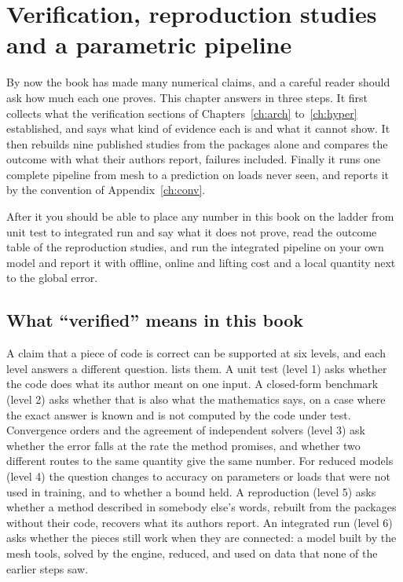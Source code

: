 \chapter{Verification, reproduction studies and a parametric pipeline}\label{ch:verif}

\begin{tcolorbox}[colback=gray!5,colframe=gray!50,title={In this chapter}]
By now the book has made many numerical claims, and a careful reader should ask how much each one proves. This chapter answers in three steps. It first collects what the verification sections of Chapters~\ref{ch:arch} to~\ref{ch:hyper} established, and says what kind of evidence each is and what it cannot show. It then rebuilds nine published studies from the packages alone and compares the outcome with what their authors report, failures included. Finally it runs one complete pipeline from mesh to a prediction on loads never seen, and reports it by the convention of Appendix~\ref{ch:conv}.\par\smallskip
After it you should be able to place any number in this book on the ladder from unit test to integrated run and say what it does not prove, read the outcome table of the reproduction studies, and run the integrated pipeline on your own model and report it with offline, online and lifting cost and a local quantity next to the global error.
\end{tcolorbox}

\section{What ``verified'' means in this book}\label{sec:vf-levels}

A claim that a piece of code is correct can be supported at six levels, and each level answers a different question.  lists them. A unit test (level 1) asks whether the code does what its author meant on one input. A closed-form benchmark (level 2) asks whether that is also what the mathematics says, on a case where the exact answer is known and is not computed by the code under test. Convergence orders and the agreement of independent solvers (level 3) ask whether the error falls at the rate the method promises, and whether two different routes to the same quantity give the same number. For reduced models (level 4) the question changes to accuracy on parameters or loads that were not used in training, and to whether a bound held. A reproduction (level 5) asks whether a method described in somebody else's words, rebuilt from the packages without their code, recovers what its authors report. An integrated run (level 6) asks whether the pieces still work when they are connected: a model built by the mesh tools, solved by the engine, reduced, and used on data that none of the earlier steps saw.

